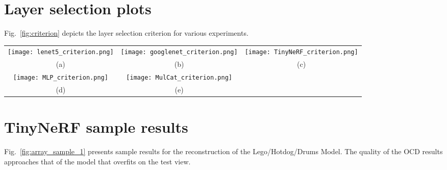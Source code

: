 \documentclass{article}
\theoremstyle{plain}
\begin{document}
\section{Layer selection plots}
\label{app:criterion}
Fig.~\ref{fig:criterion} depicts the layer selection criterion for various experiments.

\begin{figure*}[t]
  \begin{tabular}{ccc}
     \texttt{[image: lenet5\_criterion.png]} & 
          \texttt{[image: googlenet\_criterion.png]} &
          \texttt{[image: TinyNeRF\_criterion.png]}\\
          (a)&
     (b) &
     (c)\\
     \texttt{[image: MLP\_criterion.png]} & 
     \texttt{[image: MulCat\_criterion.png]} \\ 
     (d)&(e)
  \end{tabular}
    \caption{ Layer Selection Criterion for different experiments. (a) For LeNet5 on MNIST, the next to last Fully-Connected layer is selected since it has the maximal entropy. (b) For GoogleNet on CIFAR10, the last Fully-Connected layer is selected. (c) For TinyNeRF (three datasets), the first Fully-Connected layer is selected. 
    (d) For Tabular MLP the first layer is selected. (e) For MulCat the last projection layer is selected.}
    \label{fig:criterion}
\end{figure*}

\section{TinyNeRF sample results}

\label{app:tinynerfresults}
Fig.~\ref{fig:array_sample_1} presents sample results for the reconstruction of the Lego/Hotdog/Drums Model. The quality of the OCD results approaches that of the model that overfits on the test view.
\end{document}
